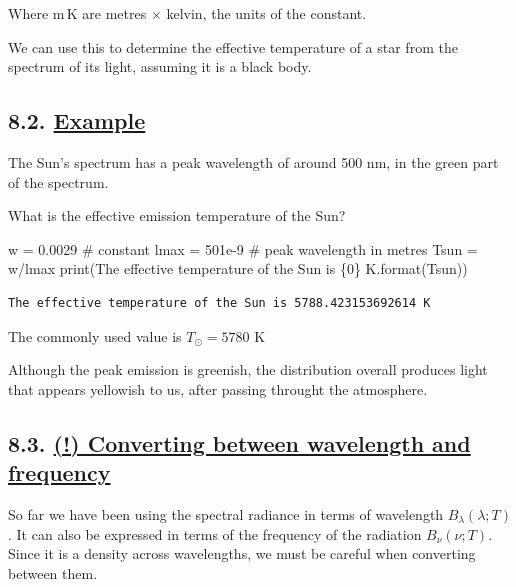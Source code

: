 \documentclass[
  letterpaper,
  DIV=11,
  numbers=noendperiod]{scrartcl}
\newenvironment{Shaded}{\begin{snugshade}}{\end{snugshade}}
\newcommand{\BuiltInTok}[1]{\textcolor[rgb]{0.00,0.23,0.31}{#1}}
\newcommand{\CommentTok}[1]{\textcolor[rgb]{0.37,0.37,0.37}{#1}}
\newcommand{\FloatTok}[1]{\textcolor[rgb]{0.68,0.00,0.00}{#1}}
\newcommand{\NormalTok}[1]{\textcolor[rgb]{0.00,0.23,0.31}{#1}}
\newcommand{\OperatorTok}[1]{\textcolor[rgb]{0.37,0.37,0.37}{#1}}
\newcommand{\SpecialCharTok}[1]{\textcolor[rgb]{0.37,0.37,0.37}{#1}}
\newcommand{\StringTok}[1]{\textcolor[rgb]{0.13,0.47,0.30}{#1}}
\begin{document}
Where \(\mathrm{m\,K}\) are metres \(\times\) kelvin, the units of the
constant.

We can use this to determine the effective temperature of a star from
the spectrum of its light, assuming it is a black body.

\hypertarget{example-2}{%
\subsection{\texorpdfstring{8.2.
\protect\hyperlink{toc0_}{Example}}{8.2. Example}}\label{example-2}}

The Sun's spectrum has a peak wavelength of around 500 nm, in the green
part of the spectrum.

What is the effective emission temperature of the Sun?

\begin{Shaded}
\begin{Highlighting}[]
\NormalTok{w }\OperatorTok{=} \FloatTok{0.0029} \CommentTok{\# constant}
\NormalTok{lmax }\OperatorTok{=} \FloatTok{501e{-}9} \CommentTok{\# peak wavelength in metres}
\NormalTok{Tsun }\OperatorTok{=}\NormalTok{ w}\OperatorTok{/}\NormalTok{lmax}
\BuiltInTok{print}\NormalTok{(}\StringTok{\textquotesingle{}The effective temperature of the Sun is }\SpecialCharTok{\{0\}}\StringTok{ K\textquotesingle{}}\NormalTok{.}\BuiltInTok{format}\NormalTok{(Tsun))}
\end{Highlighting}
\end{Shaded}

\begin{verbatim}
The effective temperature of the Sun is 5788.423153692614 K
\end{verbatim}

The commonly used value is \(T_\odot=5780\) K

Although the peak emission is greenish, the distribution overall
produces light that appears yellowish to us, after passing throught the
atmosphere.

\hypertarget{converting-between-wavelength-and-frequency}{%
\subsection{\texorpdfstring{8.3. \protect\hyperlink{toc0_}{(!)
Converting between wavelength and
frequency}}{8.3. (!) Converting between wavelength and frequency}}\label{converting-between-wavelength-and-frequency}}

So far we have been using the spectral radiance in terms of wavelength
\(B_\lambda(\lambda;T)\). It can also be expressed in terms of the
frequency of the radiation \(B_\nu(\nu;T)\). Since it is a density
across wavelengths, we must be careful when converting between them.
\end{document}
